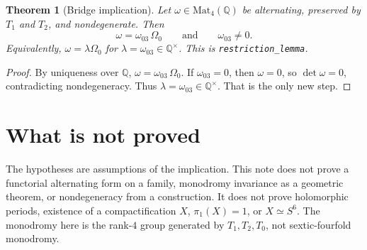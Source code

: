 \documentclass[11pt]{article}
\newtheorem{theorem}{Theorem}
\theoremstyle{definition}
\begin{document}
\begin{theorem}[Bridge implication]\label{thm:bridge}
Let \(\omega\in\mathrm{Mat}_4(\mathbb{Q})\) be alternating, preserved by \(T_1\) and \(T_2\), and nondegenerate.
Then
\[
\omega=\omega_{03}\,\Omega_0
\qquad\text{and}\qquad
\omega_{03}\neq 0.
\]
Equivalently, \(\omega=\lambda\Omega_0\) for \(\lambda=\omega_{03}\in\mathbb{Q}^{\times}\).
This is \texttt{restriction\_lemma}.
\end{theorem}

\begin{proof}
By uniqueness over \(\mathbb{Q}\),
\(\omega=\omega_{03}\,\Omega_0\).
If \(\omega_{03}=0\), then \(\omega=0\), so \(\det\omega=0\), contradicting nondegeneracy.
Thus \(\lambda=\omega_{03}\in\mathbb{Q}^{\times}\).
That is the only new step.
\end{proof}

\section{What is not proved}
The hypotheses are assumptions of the implication.
This note does not prove a functorial alternating form on a family, monodromy invariance as a geometric theorem, or nondegeneracy from a construction.
It does not prove holomorphic periods, existence of a compactification \(X\), \(\pi_1(X)=1\), or \(X\simeq S^6\).
The monodromy here is the rank-\(4\) group generated by \(T_1,T_2,T_0\), not sextic-fourfold monodromy.
\end{document}
